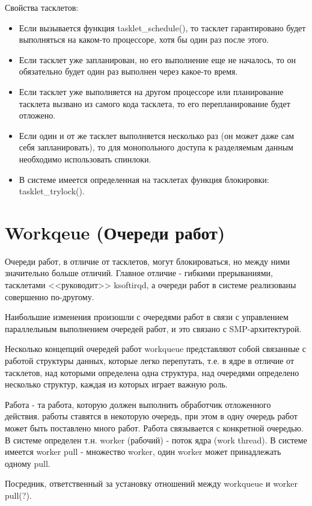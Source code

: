 \documentclass[12pt,a4paper]{scrreprt}
\begin{document}
Свойства тасклетов:

\begin{itemize}
	\item Если вызывается функция tasklet\_schedule(), то тасклет гарантировано будет выполняться на каком-то процессоре, хотя бы один раз после этого. 
	\item Если тасклет уже запланирован, но его выполнение еще не началось, то он обязательно будет один раз выполнен через какое-то время. 
	\item Если тасклет уже выполняется на другом процессоре или планирование тасклета вызвано из самого кода тасклета, то его перепланирование будет отложено.
	\item Если один и от же тасклет выполняется несколько раз (он может даже сам себя запланировать), то для монопольного доступа к разделяемым данным необходимо использовать спинлоки.
	\item В системе имеется определенная на тасклетах функция блокировки: tasklet\_trylock().
\end{itemize}

\section{Workqeue (Очереди работ)}

Очереди работ, в отличие от тасклетов, могут блокироваться, но между ними значительно больше отличий. Главное отличие - гибкими прерываниями, тасклетами <<руководит>> ksoftirqd, а очереди работ в системе реализованы совершенно по-другому.

Наибольшие изменения произошли с очередями работ в связи с управлением параллельным выполнением очередей работ, и это связано с SMP-архитектурой.

Несколько концепций очередей работ workqueue представляют собой связанные с работой структуры данных, которые легко перепутать, т.е. в ядре в отличие от тасклетов, над которыми определена одна структура, над очередями определено несколько структур, каждая из которых играет важную роль. 

Работа - та работа, которую должен выполнить обработчик отложенного действия. работы ставятся в некоторую очередь, при этом в одну очередь работ может быть поставлено много работ. Работа связывается с конкретной очередью. В системе определен т.н. worker (рабочий) - поток ядра (work thread). В системе имеется worker pull - множество worker, один worker может принадлежать одному pull.

Посредник, ответственный за установку отношений между workqueue и worker pull(?).
\end{document}
